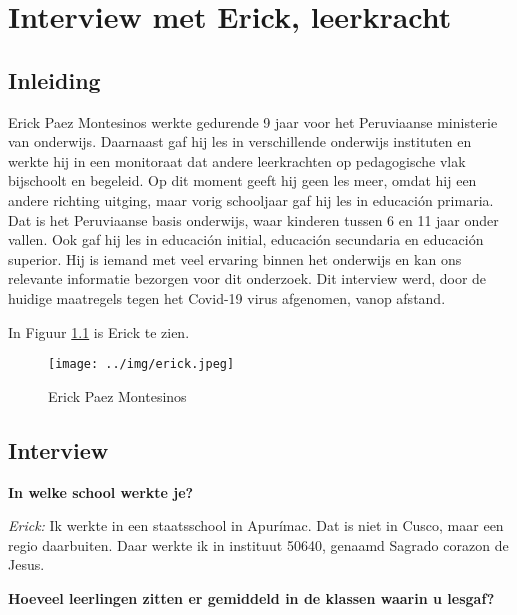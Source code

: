 \chapter{Interview met Erick, leerkracht}
\label{ch:interviewErick}

\section{Inleiding}
Erick Paez Montesinos werkte gedurende 9 jaar voor het Peruviaanse ministerie van onderwijs. Daarnaast gaf hij les in verschillende onderwijs instituten en werkte hij in een monitoraat dat andere leerkrachten op pedagogische vlak bijschoolt en begeleid. Op dit moment geeft hij geen les meer, omdat hij een andere richting uitging, maar vorig schooljaar gaf hij les in educación primaria. Dat is het Peruviaanse basis onderwijs, waar kinderen tussen 6 en 11 jaar onder vallen. \autocite{Nuffic2015} Ook gaf hij les in educación initial, educación secundaria en educación superior. Hij is iemand met veel ervaring binnen het onderwijs en kan ons relevante informatie bezorgen voor dit onderzoek. Dit interview werd, door de huidige maatregels tegen het Covid-19 virus afgenomen, vanop afstand.

 In Figuur \ref{erick} is Erick te zien.
 
 \begin{figure}[h!]
 	\texttt{[image: ../img/erick.jpeg]}
 	\caption{Erick Paez Montesinos }
 	\label{erick}
 \end{figure}

\section{Interview}

\textbf{In welke school werkte je?}

\textit{Erick:} Ik werkte in een staatsschool in Apurímac. Dat is niet in Cusco, maar een regio daarbuiten. Daar werkte ik in instituut 50640, genaamd Sagrado corazon de Jesus.

\textbf{Hoeveel leerlingen zitten er gemiddeld in de klassen waarin u lesgaf?}

